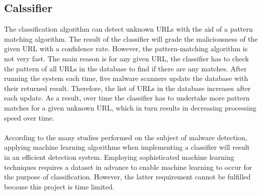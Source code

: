 
\subsection{Calssifier}

The classification algorithm can detect unknown URLs with the aid of a pattern matching algorithm. The result of the classifier will grade the maliciousness of the given URL with a confidence rate. However, the pattern-matching algorithm is not very fast. The main reason is for any given URL, the classifier has to check the pattern of all URLs in the database to find if there are any matches. After running the system each time, five malware scanners update the database with their returned result. Therefore, the list of URLs in the database increases after each update. As a result, over time the classifier has to undertake more pattern matches for a given unknown URL, which in turn results in decreasing processing speed over time.

\paragraph{} 
According to the many studies performed on the subject of malware detection, applying machine learning algorithms when implementing a classifier will result in an efficient detection system. Employing sophisticated machine learning techniques requires a dataset in advance to enable machine learning to occur for the purpose of classification. However, the latter requirement cannot be fulfilled because this project is time limited.

